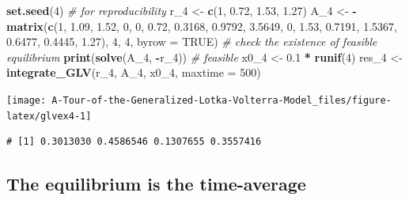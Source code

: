 \documentclass[]{book}
\newenvironment{Shaded}{\begin{snugshade}}{\end{snugshade}}
\newcommand{\CommentTok}[1]{\textcolor[rgb]{0.56,0.35,0.01}{\textit{#1}}}
\newcommand{\DataTypeTok}[1]{\textcolor[rgb]{0.13,0.29,0.53}{#1}}
\newcommand{\DecValTok}[1]{\textcolor[rgb]{0.00,0.00,0.81}{#1}}
\newcommand{\FloatTok}[1]{\textcolor[rgb]{0.00,0.00,0.81}{#1}}
\newcommand{\KeywordTok}[1]{\textcolor[rgb]{0.13,0.29,0.53}{\textbf{#1}}}
\newcommand{\NormalTok}[1]{#1}
\newcommand{\OperatorTok}[1]{\textcolor[rgb]{0.81,0.36,0.00}{\textbf{#1}}}
\newcommand{\OtherTok}[1]{\textcolor[rgb]{0.56,0.35,0.01}{#1}}
\newcommand{\StringTok}[1]{\textcolor[rgb]{0.31,0.60,0.02}{#1}}
\begin{document}
\begin{Shaded}
\begin{Highlighting}[]
\KeywordTok{set.seed}\NormalTok{(}\DecValTok{4}\NormalTok{) }\CommentTok{# for reproducibility}
\NormalTok{r_}\DecValTok{4}\NormalTok{ <-}\StringTok{ }\KeywordTok{c}\NormalTok{(}\DecValTok{1}\NormalTok{, }\FloatTok{0.72}\NormalTok{, }\FloatTok{1.53}\NormalTok{, }\FloatTok{1.27}\NormalTok{)}
\NormalTok{A_}\DecValTok{4}\NormalTok{ <-}\StringTok{ }\OperatorTok{-}\KeywordTok{matrix}\NormalTok{(}\KeywordTok{c}\NormalTok{(}\DecValTok{1}\NormalTok{, }\FloatTok{1.09}\NormalTok{, }\FloatTok{1.52}\NormalTok{, }\DecValTok{0}\NormalTok{, }
                 \DecValTok{0}\NormalTok{, }\FloatTok{0.72}\NormalTok{, }\FloatTok{0.3168}\NormalTok{, }\FloatTok{0.9792}\NormalTok{, }
                 \FloatTok{3.5649}\NormalTok{, }\DecValTok{0}\NormalTok{, }\FloatTok{1.53}\NormalTok{, }\FloatTok{0.7191}\NormalTok{,}
                 \FloatTok{1.5367}\NormalTok{, }\FloatTok{0.6477}\NormalTok{, }\FloatTok{0.4445}\NormalTok{, }\FloatTok{1.27}\NormalTok{), }\DecValTok{4}\NormalTok{, }\DecValTok{4}\NormalTok{, }\DataTypeTok{byrow =} \OtherTok{TRUE}\NormalTok{)}
\CommentTok{# check the existence of feasible equilibrium}
\KeywordTok{print}\NormalTok{(}\KeywordTok{solve}\NormalTok{(A_}\DecValTok{4}\NormalTok{, }\OperatorTok{-}\NormalTok{r_}\DecValTok{4}\NormalTok{)) }\CommentTok{# feasible}
\NormalTok{x0_}\DecValTok{4}\NormalTok{ <-}\StringTok{ }\FloatTok{0.1} \OperatorTok{*}\StringTok{ }\KeywordTok{runif}\NormalTok{(}\DecValTok{4}\NormalTok{)}
\NormalTok{res_}\DecValTok{4}\NormalTok{ <-}\StringTok{ }\KeywordTok{integrate_GLV}\NormalTok{(r_}\DecValTok{4}\NormalTok{, A_}\DecValTok{4}\NormalTok{, x0_}\DecValTok{4}\NormalTok{, }\DataTypeTok{maxtime =} \DecValTok{500}\NormalTok{)}
\end{Highlighting}
\end{Shaded}

\begin{center}\texttt{[image: A-Tour-of-the-Generalized-Lotka-Volterra-Model\_files/figure-latex/glvex4-1]} \end{center}

\begin{verbatim}
# [1] 0.3013030 0.4586546 0.1307655 0.3557416
\end{verbatim}

\hypertarget{the-equilibrium-is-the-time-average}{%
\subsection{The equilibrium is the time-average}\label{the-equilibrium-is-the-time-average}}
\end{document}
